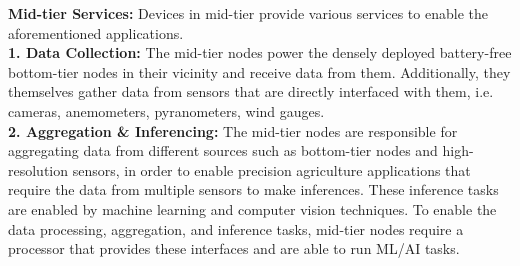 
\noindent\textbf{Mid-tier Services:}
Devices in mid-tier provide various services to enable the aforementioned applications.\\

\noindent\textbf{1. Data Collection:} The mid-tier nodes power the densely deployed battery-free bottom-tier nodes in their vicinity and receive data from them. Additionally, they themselves gather data from sensors that are directly interfaced with them, i.e. cameras, anemometers, pyranometers, wind gauges.\\
\noindent\textbf{2. Aggregation \& Inferencing:} The mid-tier nodes are responsible for aggregating data from different sources such as bottom-tier nodes and high-resolution sensors, in order to enable precision agriculture applications that require the data from multiple sensors to make inferences. %
These inference tasks are enabled by machine learning and computer vision techniques. To enable the data processing, aggregation, and inference tasks, mid-tier nodes require a processor that provides these interfaces and are able to run ML/AI tasks.%

